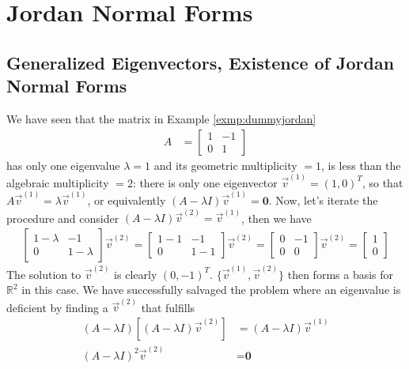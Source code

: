 \section{Jordan Normal Forms}
\label{sec:JNF}

\subsection{Generalized Eigenvectors, Existence of Jordan Normal Forms}

We have seen that the matrix in Example \ref{exmp:dummyjordan}
\begin{align*}
A &=
\begin{bmatrix}
1 & -1 \\
0 & 1
\end{bmatrix}
\end{align*}
has only one eigenvalue $\lambda = 1$ and its geometric multiplicity $= 1$, is less than the algebraic multiplicity $= 2$: there is only one eigenvector $\vec{v}^{(1)} = (1,0)^T$, so that $A\vec{v}^{(1)} = \lambda\vec{v}^{(1)}$, or equivalently $(A - \lambda I)\vec{v}^{(1)} = \textbf{0}$. Now, let's iterate the procedure and consider $(A - \lambda I)\vec{v}^{(2)} = \vec{v}^{(1)}$, then we have
\begin{align*}
\begin{bmatrix}
1-\lambda & -1 \\
0 & 1-\lambda
\end{bmatrix} 
\vec{v}^{(2)}
=
\begin{bmatrix}
1-1 & -1 \\
0 & 1-1
\end{bmatrix}
\vec{v}^{(2)} 
=
\begin{bmatrix}
0 & -1 \\
0 & 0
\end{bmatrix} 
\vec{v}^{(2)}
=
\begin{bmatrix}
1 \\
0
\end{bmatrix} 
\end{align*}
The solution to $\vec{v}^{(2)}$ is clearly $(0,-1)^T$. $\{\vec{v}^{(1)}, \vec{v}^{(2)}\}$ then forms a basis for $\mathbb{R}^2$ in this case. We have successfully salvaged the problem where an eigenvalue is deficient by finding a  $\vec{v}^{(2)}$ that fulfills
\begin{align*}
(A - \lambda I)[(A - \lambda I)\vec{v}^{(2)}] &= (A - \lambda I)\vec{v}^{(1)} \\
(A - \lambda I)^2\vec{v}^{(2)} &= \textbf{0}
\end{align*}
